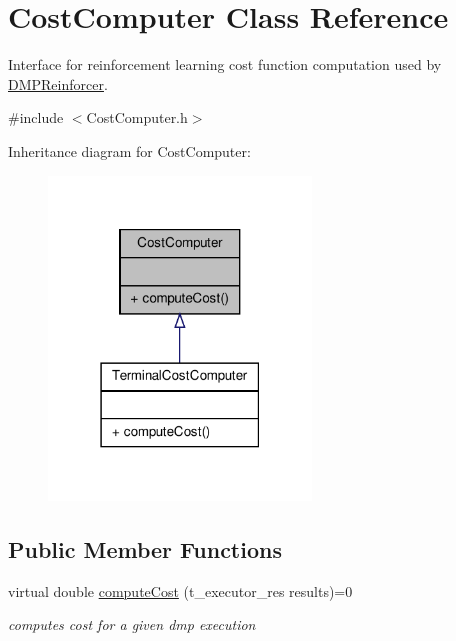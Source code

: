 \hypertarget{classCostComputer}{\section{\-Cost\-Computer \-Class \-Reference}
\label{classCostComputer}
}


\-Interface for reinforcement learning cost function computation used by \hyperlink{classDMPReinforcer}{\-D\-M\-P\-Reinforcer}.  




{\ttfamily \#include $<$\-Cost\-Computer.\-h$>$}



\-Inheritance diagram for \-Cost\-Computer\-:\nopagebreak
\begin{figure}[H]
\begin{center}
\leavevmode
\includegraphics[width=198pt]{classCostComputer__inherit__graph}
\end{center}
\end{figure}
\subsection*{\-Public \-Member \-Functions}
\begin{DoxyCompactItemize}
\item 
virtual double \hyperlink{classCostComputer_a139032631f2d4bd1882d9e5e47960eb0}{compute\-Cost} (t\-\_\-executor\-\_\-res results)=0
\begin{DoxyCompactList}\small\item\em computes cost for a given dmp execution \end{DoxyCompactList}\end{DoxyCompactItemize}


